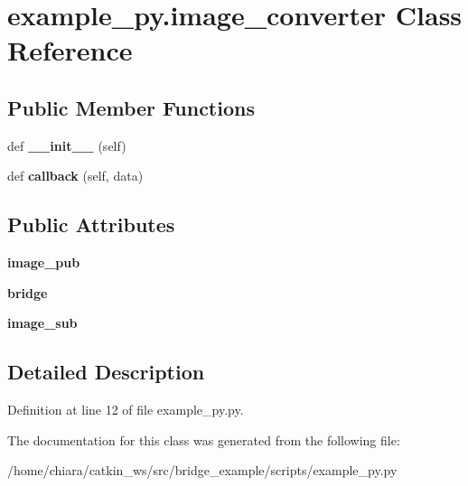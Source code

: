 \hypertarget{classexample__py_1_1image__converter}{}\section{example\+\_\+py.\+image\+\_\+converter Class Reference}
\label{classexample__py_1_1image__converter}
\subsection*{Public Member Functions}
\begin{DoxyCompactItemize}
\item 
def {\bfseries \+\_\+\+\_\+init\+\_\+\+\_\+} (self)\hypertarget{classexample__py_1_1image__converter_a18ec5d479e99f68fb37eea8b062acd03}{}\label{classexample__py_1_1image__converter_a18ec5d479e99f68fb37eea8b062acd03}

\item 
def {\bfseries callback} (self, data)\hypertarget{classexample__py_1_1image__converter_a8eb0095c652c0dd58e92dbfa3831bcea}{}\label{classexample__py_1_1image__converter_a8eb0095c652c0dd58e92dbfa3831bcea}

\end{DoxyCompactItemize}
\subsection*{Public Attributes}
\begin{DoxyCompactItemize}
\item 
{\bfseries image\+\_\+pub}\hypertarget{classexample__py_1_1image__converter_ac69e248a955e409b2b29970e514438cb}{}\label{classexample__py_1_1image__converter_ac69e248a955e409b2b29970e514438cb}

\item 
{\bfseries bridge}\hypertarget{classexample__py_1_1image__converter_a6b4a18575981a09a02ca641616cb401c}{}\label{classexample__py_1_1image__converter_a6b4a18575981a09a02ca641616cb401c}

\item 
{\bfseries image\+\_\+sub}\hypertarget{classexample__py_1_1image__converter_addefa0b737aab40d26609d1fc95c2f99}{}\label{classexample__py_1_1image__converter_addefa0b737aab40d26609d1fc95c2f99}

\end{DoxyCompactItemize}


\subsection{Detailed Description}


Definition at line 12 of file example\+\_\+py.\+py.



The documentation for this class was generated from the following file\+:\begin{DoxyCompactItemize}
\item 
/home/chiara/catkin\+\_\+ws/src/bridge\+\_\+example/scripts/example\+\_\+py.\+py\end{DoxyCompactItemize}
